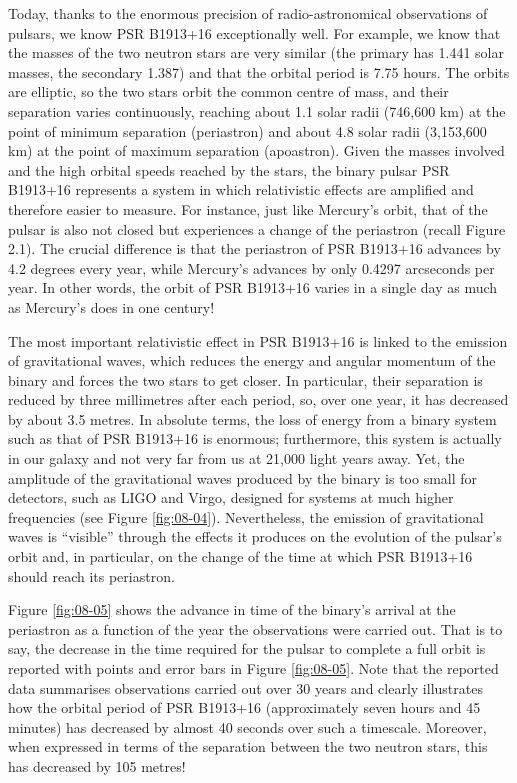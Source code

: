 Today, thanks to the enormous precision of radio-astronomical observations of pulsars,
we know PSR B1913+16 exceptionally well. For example, we know that
the masses of the two neutron stars are very similar (the primary has 1.441 solar
masses, the secondary 1.387) and that the orbital period is 7.75 hours. The orbits are
elliptic, so the two stars orbit the common centre of mass, and their separation varies
continuously, reaching about 1.1 solar radii (746,600 km) at the point of minimum
separation (periastron) and about 4.8 solar radii (3,153,600 km) at
the point of maximum separation (apoastron). Given the masses
involved and the high orbital speeds reached by the stars, the binary pulsar PSR
B1913+16 represents a system in which relativistic effects are
amplified and therefore easier to measure. For instance, just like
Mercury's orbit, that of the pulsar is also not closed but
experiences a change of the periastron (recall Figure 2.1). The crucial difference is
that the periastron of PSR B1913+16 advances by 4.2 degrees every year, while
Mercury's advances by only 0.4297 arcseconds per year. In other
words, the orbit of PSR B1913+16 varies in a single day as much as Mercury's does in one
century!

The most important relativistic effect in PSR
B1913+16 is linked to the emission of gravitational waves, which
reduces the energy and angular momentum of the binary and forces the two stars to get
closer. In particular, their separation is reduced by three millimetres after each
period, so, over one year, it has decreased by about 3.5 metres. In absolute terms, the
loss of energy from a binary system such as that of PSR B1913+16 is enormous;
furthermore, this system is actually in our galaxy and not very far from us at 21,000
light years away. Yet, the amplitude of the gravitational waves produced by the binary
is too small for detectors, such as LIGO and Virgo, designed for systems at much higher
frequencies (see Figure \ref{fig:08-04}). Nevertheless, the emission of gravitational waves is
``visible'' through the effects it produces on the evolution of the pulsar's orbit and,
in particular, on the change of the time at which PSR B1913+16 should reach its
periastron.

Figure \ref{fig:08-05} shows the advance in time of the binary's arrival at the
periastron as a function of the year the observations were carried
out. That is to say, the decrease in the time required for the pulsar to complete a full
orbit is reported with points and error bars in Figure \ref{fig:08-05}. Note that the reported data
summarises observations carried out over 30 years and clearly illustrates how the
orbital period of PSR B1913+16 (approximately seven hours and 45
minutes) has decreased by almost 40 seconds over such a timescale. Moreover, when
expressed in terms of the separation between the two neutron stars,
this has decreased by 105 metres!

